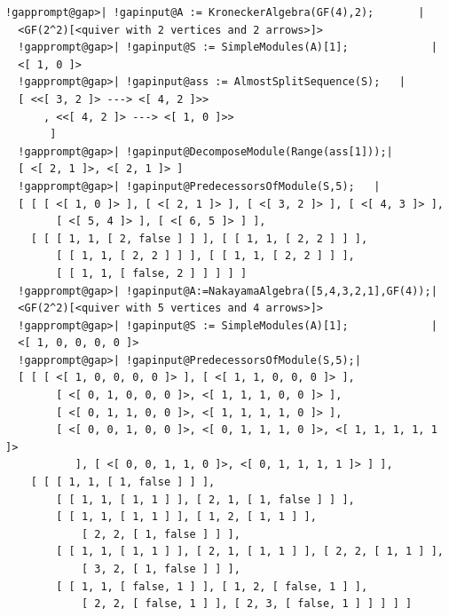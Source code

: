\documentclass[a4paper,11pt]{report}
\begin{document}
{{ 
\begin{Verbatim}[commandchars=!@|,fontsize=\small,frame=single,label=Example]
  !gapprompt@gap>| !gapinput@A := KroneckerAlgebra(GF(4),2);       |
  <GF(2^2)[<quiver with 2 vertices and 2 arrows>]>
  !gapprompt@gap>| !gapinput@S := SimpleModules(A)[1];             |
  <[ 1, 0 ]>
  !gapprompt@gap>| !gapinput@ass := AlmostSplitSequence(S);   |
  [ <<[ 3, 2 ]> ---> <[ 4, 2 ]>>
      , <<[ 4, 2 ]> ---> <[ 1, 0 ]>>
       ]
  !gapprompt@gap>| !gapinput@DecomposeModule(Range(ass[1]));|
  [ <[ 2, 1 ]>, <[ 2, 1 ]> ]
  !gapprompt@gap>| !gapinput@PredecessorsOfModule(S,5);   |
  [ [ [ <[ 1, 0 ]> ], [ <[ 2, 1 ]> ], [ <[ 3, 2 ]> ], [ <[ 4, 3 ]> ], 
        [ <[ 5, 4 ]> ], [ <[ 6, 5 ]> ] ], 
    [ [ [ 1, 1, [ 2, false ] ] ], [ [ 1, 1, [ 2, 2 ] ] ], 
        [ [ 1, 1, [ 2, 2 ] ] ], [ [ 1, 1, [ 2, 2 ] ] ], 
        [ [ 1, 1, [ false, 2 ] ] ] ] ]
  !gapprompt@gap>| !gapinput@A:=NakayamaAlgebra([5,4,3,2,1],GF(4));|
  <GF(2^2)[<quiver with 5 vertices and 4 arrows>]>
  !gapprompt@gap>| !gapinput@S := SimpleModules(A)[1];             |
  <[ 1, 0, 0, 0, 0 ]>
  !gapprompt@gap>| !gapinput@PredecessorsOfModule(S,5);|
  [ [ [ <[ 1, 0, 0, 0, 0 ]> ], [ <[ 1, 1, 0, 0, 0 ]> ], 
        [ <[ 0, 1, 0, 0, 0 ]>, <[ 1, 1, 1, 0, 0 ]> ], 
        [ <[ 0, 1, 1, 0, 0 ]>, <[ 1, 1, 1, 1, 0 ]> ], 
        [ <[ 0, 0, 1, 0, 0 ]>, <[ 0, 1, 1, 1, 0 ]>, <[ 1, 1, 1, 1, 1 ]> 
           ], [ <[ 0, 0, 1, 1, 0 ]>, <[ 0, 1, 1, 1, 1 ]> ] ], 
    [ [ [ 1, 1, [ 1, false ] ] ], 
        [ [ 1, 1, [ 1, 1 ] ], [ 2, 1, [ 1, false ] ] ], 
        [ [ 1, 1, [ 1, 1 ] ], [ 1, 2, [ 1, 1 ] ], 
            [ 2, 2, [ 1, false ] ] ], 
        [ [ 1, 1, [ 1, 1 ] ], [ 2, 1, [ 1, 1 ] ], [ 2, 2, [ 1, 1 ] ], 
            [ 3, 2, [ 1, false ] ] ], 
        [ [ 1, 1, [ false, 1 ] ], [ 1, 2, [ false, 1 ] ], 
            [ 2, 2, [ false, 1 ] ], [ 2, 3, [ false, 1 ] ] ] ] ] 
\end{Verbatim}
 }

 }

 
\end{document}
